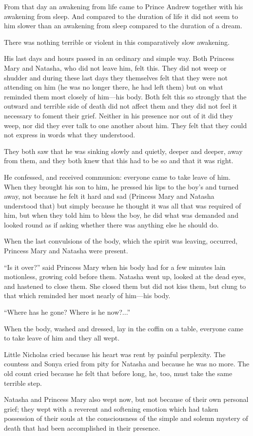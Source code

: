 From that day an awakening from life came to Prince Andrew
together with his awakening from sleep. And compared to the
duration of life it did not seem to him slower than an awakening
from sleep compared to the duration of a dream.

There was nothing terrible or violent in this comparatively slow
awakening.

His last days and hours passed in an ordinary and simple
way. Both Princess Mary and Natasha, who did not leave him, felt
this. They did not weep or shudder and during these last days
they themselves felt that they were not attending on him (he was
no longer there, he had left them) but on what reminded them most
closely of him---his body. Both felt this so strongly that the
outward and terrible side of death did not affect them and they
did not feel it necessary to foment their grief.  Neither in his
presence nor out of it did they weep, nor did they ever talk to
one another about him. They felt that they could not express in
words what they understood.

They both saw that he was sinking slowly and quietly, deeper and
deeper, away from them, and they both knew that this had to be so
and that it was right.

He confessed, and received communion: everyone came to take leave
of him. When they brought his son to him, he pressed his lips to
the boy's and turned away, not because he felt it hard and sad
(Princess Mary and Natasha understood that) but simply because he
thought it was all that was required of him, but when they told
him to bless the boy, he did what was demanded and looked round
as if asking whether there was anything else he should do.

When the last convulsions of the body, which the spirit was
leaving, occurred, Princess Mary and Natasha were present.

``Is it over?'' said Princess Mary when his body had for a few
minutes lain motionless, growing cold before them. Natasha went
up, looked at the dead eyes, and hastened to close them. She
closed them but did not kiss them, but clung to that which
reminded her most nearly of him---his body.

``Where has he gone? Where is he now?...''

When the body, washed and dressed, lay in the coffin on a table,
everyone came to take leave of him and they all wept.

Little Nicholas cried because his heart was rent by painful
perplexity.  The countess and Sonya cried from pity for Natasha
and because he was no more. The old count cried because he felt
that before long, he, too, must take the same terrible step.

Natasha and Princess Mary also wept now, but not because of their
own personal grief; they wept with a reverent and softening
emotion which had taken possession of their souls at the
consciousness of the simple and solemn mystery of death that had
been accomplished in their presence.